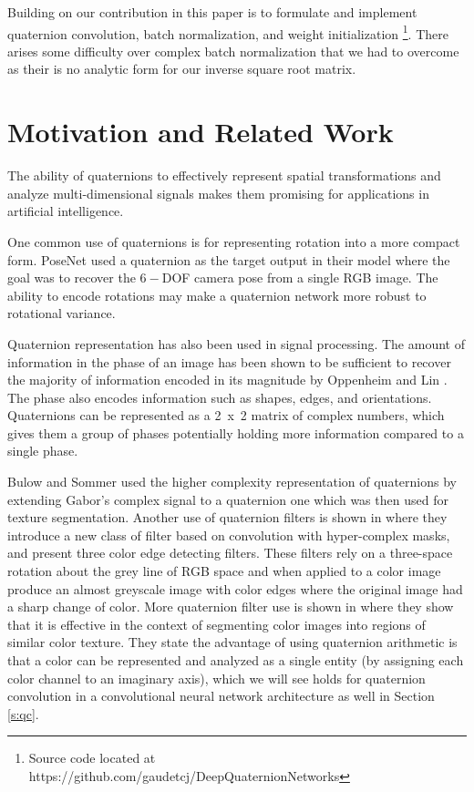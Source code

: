 \documentclass[conference]{IEEEtran}
\begin{document}
Building on \cite{trabelsi2017deep} our contribution in this paper is to formulate and implement quaternion convolution, batch normalization, and weight initialization \footnote{Source code located at https://github.com/gaudetcj/DeepQuaternionNetworks}.
There arises some difficulty over complex batch normalization that we had to overcome as their is no analytic form for our inverse square root matrix.

\section{Motivation and Related Work}
The ability of quaternions to effectively represent spatial transformations and analyze multi-dimensional signals makes them promising for applications in artificial intelligence.

One common use of quaternions is for representing rotation into a more compact form. 
PoseNet \cite{kendall2015posenet} used a quaternion as the target output in their model where the goal was to recover the $6-$DOF camera pose from a single RGB image.
The ability to encode rotations may make a quaternion network more robust to rotational variance.

Quaternion representation has also been used in signal processing.  
The amount of information in the phase of an image has been shown to be sufficient to recover the majority of information encoded in its magnitude by Oppenheim and Lin \cite{oppenheim1981importance}.
The phase also encodes information such as shapes, edges, and orientations.
Quaternions can be represented as a 2~x~2 matrix of complex numbers, which gives them a group of phases potentially holding more information compared to a single phase.

Bulow and Sommer \cite{bulow2001hypercomplex} used the higher complexity representation of quaternions by extending Gabor's complex signal to a quaternion one which was then used for texture segmentation.
Another use of quaternion filters is shown in \cite{sangwine2000colour} where they introduce a new class of filter based on convolution with hyper-complex masks, and present three color edge detecting filters. 
These filters rely on a three-space rotation about the grey line of RGB space and when applied to a color image produce an almost greyscale image with color edges where the original image had a sharp change of color.
More quaternion filter use is shown in \cite{shi2007quaternion} where they show that it is effective in the context of segmenting color images into regions of similar color texture. 
They state the advantage of using quaternion arithmetic is that a color can be represented and analyzed as a single entity (by assigning each color channel to an imaginary axis), which we will see holds for quaternion convolution in a convolutional neural network architecture as well in Section \ref{s:qc}.
\end{document}
